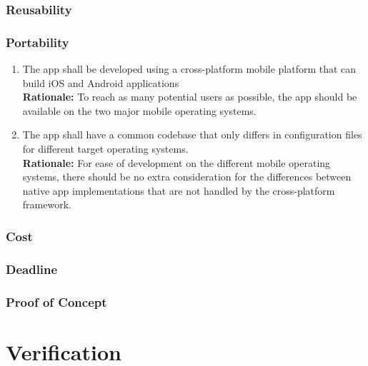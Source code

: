 \documentclass{article}
\begin{document}
\subsubsection{Reusability}

\subsubsection{Portability}
\label{ssub:portability}


\begin{enumerate}[align=left, label=\textbf{DI-P\arabic*.}]
    \item The app shall be developed using a cross-platform mobile platform that can build iOS and Android applications\\
    {\bf Rationale:} To reach as many potential users as possible, the app should be available on the two major mobile operating systems.
    \item The app shall have a common codebase that only differs in configuration files for different target operating systems.\\
    {\bf Rationale:} For ease of development on the different mobile operating systems, there should be no extra consideration for the differences between native app implementations that are not handled by the cross-platform framework.
\end{enumerate}

\subsubsection{Cost}


\subsubsection{Deadline}


\subsubsection{Proof of Concept}

\section{Verification}
\end{document}
